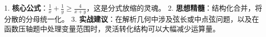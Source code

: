 \begin{summarybox}
1. \textbf{核心公式}：$\frac{1}{x} + \frac{1}{y} \geqslant \frac{4}{x+y}$，这是分式放缩的灵魂。 
2. \textbf{思想精髓}：结构化合并，将分散的分母统一化。 
3. \textbf{实战建议}：在解析几何中涉及弦长或中点弦问题，以及在函数压轴题中处理变量范围时，灵活转化结构可以大幅减少运算量。 
\end{summarybox}